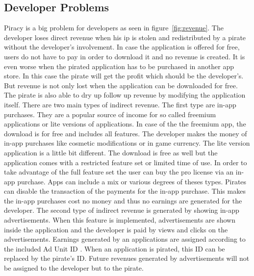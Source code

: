 \subsection{Developer Problems} \label{subsection:foundation-piracy-developers}
Piracy is a big problem for developers as seen in figure~\ref{fig:revenue}.
The developer loses direct revenue when his \gls{ip} is stolen and redistributed by a pirate without the developer's involvement.
In case the application is offered for free, users do not have to pay in order to download it and no revenue is created.
It is even worse when the pirated application has to be purchased in another app store.
In this case the pirate will get the profit which should be the developer's.
\newline
But revenue is not only lost when the application can be downloaded for free.
The pirate is also able to dry up follow up revenue by modifying the application itself.
There are two main types of indirect revenue.
The first type are in-app purchases.
They are a popular source of income for so called freemium applications or lite versions of applications.
In case of the the freemium app, the download is for free and includes all features.
The developer makes the money of in-app purchases like cosmetic modifications or in game currency.
The lite version application is a little bit different.
The download is free as well but the application comes with a restricted feature set or limited time of use.
In order to take advantage of the full feature set the user can buy the pro license via an in-app purchase.
Apps can include a mix or various degrees of theses types.
Pirates can disable the transaction of the payments for the in-app purchase.
This makes the in-app purchases cost no money and thus no earnings are generated for the developer.
\newline
The second type of indirect revenue is generated by showing in-app advertisements.
When this feature is implemented, advertisements are shown inside the application and the developer is paid by views and clicks on the advertisements.
Earnings generated by an applications are assigned according to the included Ad Unit ID \cite{googleAdmob}.
When an application is pirated, this ID can be replaced by the pirate's ID. Future revenues generated by advertisements will not be assigned to the developer but to the pirate.
\newline
